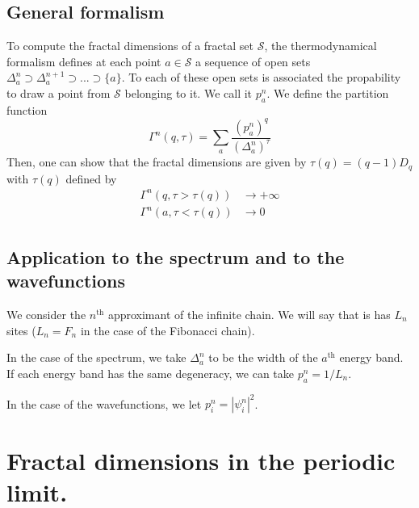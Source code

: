 \documentclass[11pt]{article}
\numberwithin{equation}{section}
\newcommand{\nth}{$n^\text{th}$}
\begin{document}
\subsection{General formalism}

To compute the fractal dimensions of a fractal set $\mathcal{S}$, the thermodynamical formalism defines at each point $a \in \mathcal{S}$ a sequence of open sets $\Delta_a^n \supset \Delta_a^{n+1} \supset ... \supset \{a\}$.
To each of these open sets is associated the propability to draw a point from $\mathcal{S}$ belonging to it. We call it $p_a^n$.
We define the partition function
\begin{equation}
	\Gamma^n(q,\tau) = \sum_a \frac{(p_a^n)^q}{(\Delta_a^n)^\tau}
\end{equation}
Then, one can show \cite{Halsey1986} that the fractal dimensions are given by $\tau(q) = (q-1) D_q$ with $\tau(q)$ defined by
\begin{align}
	\Gamma^n(q,\tau > \tau(q)) &\rightarrow +\infty \\
	\Gamma^n(a,\tau < \tau(q)) &\rightarrow 0
\end{align}

\subsection{Application to the spectrum and to the wavefunctions}
We consider the \nth{} approximant of the infinite chain. 
We will say that is has $L_n$ sites ($L_n = F_n$ in the case of the Fibonacci chain).

In the case of the spectrum, we take $\Delta_a^n$ to be the width of the $a^\text{th}$ energy band. If each energy band has the same degeneracy, we can take $p_a^n = 1/L_n$.

In the case of the wavefunctions, we let $p_i^n = |\psi_i^n|^2$. 

\newpage
\section{Fractal dimensions in the periodic limit.}
\label{app:periodic}
\end{document}
